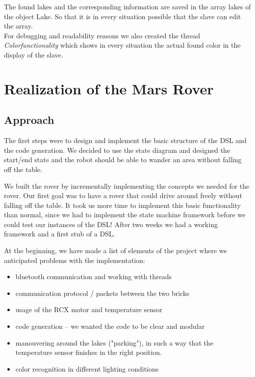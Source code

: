 \documentclass[11pt,a4paper]{article}
\begin{document}
The found lakes and the corresponding information are saved in the array lakes of the object Lake. So that it is in every situation possible that the slave can edit the array. \\

For debugging and readability reasons we also created the thread \emph{Colorfunctionality} which shows in every situation the actual found color in the display of the slave.  
  



\section{Realization of the Mars Rover}
\subsection{Approach}
The first steps were to design and implement the basic structure of the DSL and the code generation. We decided to use the state diagram and designed the start/end state and the robot should be able to wander an area without falling off the table. 

We built the rover by incrementally implementing the concepts we needed for the rover. Our first goal was to have a rover that could drive around freely without falling off the table. It took us more time to implement this basic functionality than normal, since we had to implement the state machine framework before we could test our instances of the DSL!
After two weeks we had a working framework and a first stub of a DSL. 

At the beginning, we have made a list of elements of the project where we anticipated problems with the implementation: 
\begin{itemize}
\item bluetooth communication and working with threads
\item communication protocol / packets between the two bricks
\item usage of the RCX motor and temperature sensor
\item code generation -- we wanted the code to be clear and modular
\item manouvering around the lakes ("parking"), in such a way that the temperature sensor finishes in the right position.
\item color recognition in different lighting conditions
\end{itemize}
\end{document}
